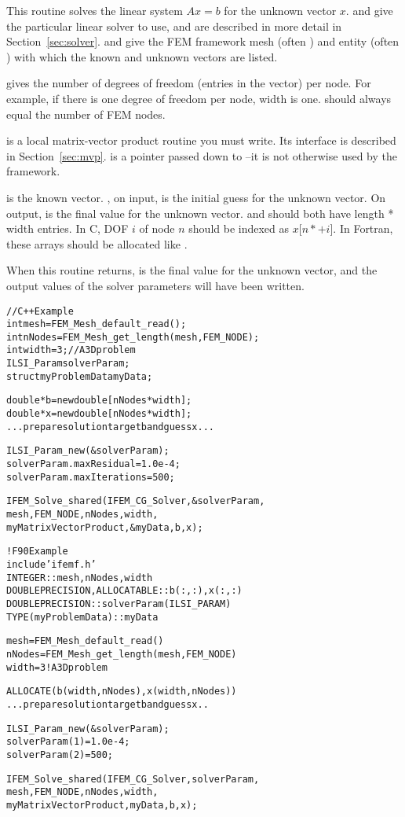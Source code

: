 \documentclass[10pt]{article}
\begin{document}
This routine solves the linear system $A x = b$ for the unknown vector $x$.   and  give the particular linear solver to use, and are described in more detail in Section~\ref{sec:solver}.   and  give the FEM framework mesh (often ) and entity (often ) with which the known and unknown vectors are listed.

 gives the number of degrees of freedom (entries in the vector) per node. For example, if there is one degree of freedom per node, width is one.   should always equal the number of FEM nodes.

 is a local matrix-vector product routine you must write.  Its interface is described in Section~\ref{sec:mvp}.  is a pointer passed down to --it is not otherwise used by the framework.  

 is the known vector.  , on input, is the initial guess for the unknown vector.  On output,  is the final value for the unknown vector.   and  should both have length * width entries.  In C, DOF $i$ of node $n$ should be indexed as $x[n*$$+i]$.  In Fortran, these arrays should be allocated like .

When this routine returns,  is the final value for the unknown vector, and the output values of the solver parameters  will have been written.

\begin{alltt}
// C++ Example
  int mesh=FEM_Mesh_default_read();
  int nNodes=FEM_Mesh_get_length(mesh,FEM_NODE);
  int width=3; //A 3D problem
  ILSI_Param solverParam;
  struct myProblemData myData;
  
  double *b=new double[nNodes*width];
  double *x=new double[nNodes*width];
  ... prepare solution target b and guess x ...
  
  ILSI_Param_new(&solverParam);
  solverParam.maxResidual=1.0e-4;
  solverParam.maxIterations=500; 
  
  IFEM_Solve_shared(IFEM_CG_Solver,&solverParam,
         mesh,FEM_NODE, nNodes,width,
         myMatrixVectorProduct, &myData, b,x);
  
! F90 Example
  include 'ifemf.h'
  INTEGER :: mesh, nNodes,width
  DOUBLE PRECISION, ALLOCATABLE :: b(:,:), x(:,:)
  DOUBLE PRECISION :: solverParam(ILSI_PARAM)
  TYPE(myProblemData) :: myData
  
  mesh=FEM_Mesh_default_read()
  nNodes=FEM_Mesh_get_length(mesh,FEM_NODE)
  width=3   ! A 3D problem
  
  ALLOCATE(b(width,nNodes), x(width,nNodes))
  ... prepare solution target b and guess x ..
  
  ILSI_Param_new(&solverParam);
  solverParam(1)=1.0e-4;
  solverParam(2)=500; 
  
  IFEM_Solve_shared(IFEM_CG_Solver,solverParam,
         mesh,FEM_NODE, nNodes,width,
         myMatrixVectorProduct, myData, b,x);

\end{alltt}
\end{document}
